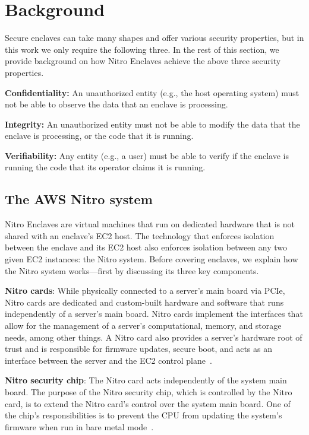 \section{Background}%
\label{sec:background}

Secure enclaves can take many shapes and offer various security properties, but
in this work we only require the following three.  In the rest of this section,
we provide background on how Nitro Enclaves achieve the above three security
properties.

\noindent \textbf{Confidentiality:} An unauthorized entity (e.g., the host
operating system) must not be able to observe the data that an enclave is
processing.

\noindent \textbf{Integrity:} An unauthorized entity must not be able to modify
the data that the enclave is processing, or the code that it is running.

\noindent \textbf{Verifiability:} Any entity (e.g., a user) must be able to
verify if the enclave is running the code that its operator claims it is
running.

\subsection{The AWS Nitro system}%
\label{sec:nitro}

Nitro Enclaves are virtual machines that run on dedicated hardware that is not
shared with an enclave's EC2 host.  The technology that enforces isolation
between the enclave and its EC2 host also enforces isolation between any two
given EC2 instances: the Nitro system.  Before covering enclaves, we explain how
the Nitro system works---first by discussing its three key components.

\textbf{Nitro cards}: While physically connected to a server's main board via
PCIe, Nitro cards are dedicated and custom-built hardware and software that runs
independently of a server's main board.  Nitro cards implement the interfaces
that allow for the management of a server's computational, memory, and storage
needs, among other things.  A Nitro card also provides a server's hardware root
of trust and is responsible for firmware updates, secure boot, and acts as an
interface between the server and the EC2 control plane~\cite[pp.
7--10]{Bean2022a}.

\textbf{Nitro security chip}: The Nitro card acts independently of the system main
board.  The purpose of the Nitro security chip, which is controlled by the Nitro
card, is to extend the Nitro card's control over the system main board.  One of
the chip's responsibilities is to prevent the CPU from updating the system's
firmware when run in bare metal mode~\cite[pp.~10--11]{Bean2022a}.

